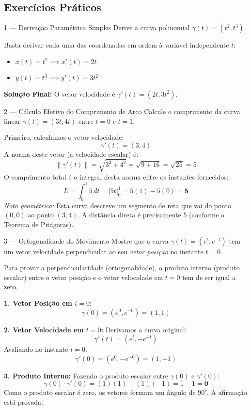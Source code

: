 \subsection{Exercícios Práticos}

\begin{exercisebox}{1 --- Derivação Paramétrica Simples}
  Derive a curva polinomial $\gamma(t)=(t^2, t^3)$.
\end{exercisebox}
\begin{solbox}
  Basta derivar cada uma das coordenadas em ordem à variável independente $t$:
  \begin{itemize}
      \item $x(t) = t^2 \implies x'(t) = 2t$
      \item $y(t) = t^3 \implies y'(t) = 3t^2$
  \end{itemize}
  \textbf{Solução Final:} O vetor velocidade é $\boxed{\gamma'(t) = (2t, 3t^2)}$.
\end{solbox}

\begin{exercisebox}{2 --- Cálculo Efetivo do Comprimento de Arco}
  Calcule o comprimento da curva linear $\gamma(t)=(3t, 4t)$ entre $t=0$ e $t=1$.
\end{exercisebox}
\begin{solbox}
  Primeiro, calculamos o vetor velocidade:
  \[
    \gamma'(t) = (3, 4)
  \]
  A norma deste vetor (a velocidade escalar) é:
  \[
    \|\gamma'(t)\| = \sqrt{3^2 + 4^2} = \sqrt{9 + 16} = \sqrt{25} = 5
  \]
  O comprimento total é o integral desta norma entre os instantes fornecidos:
  \[
    L = \int_0^1 5 \,dt = \Big[ 5t \Big]_0^1 = 5(1) - 5(0) = \mathbf{5}
  \]
  \textit{Nota geométrica:} Esta curva descreve um segmento de reta que vai do ponto $(0,0)$ ao ponto $(3,4)$. A distância direta é precisamente 5 (conforme o Teorema de Pitágoras).
\end{solbox}

\begin{exercisebox}{3 --- Ortogonalidade do Movimento}
  Mostre que a curva $\gamma(t)=(e^t, e^{-t})$ tem um vetor velocidade perpendicular ao seu \emph{vetor posição} no instante $t=0$.
\end{exercisebox}
\begin{solbox}
  Para provar a perpendicularidade (ortogonalidade), o produto interno (produto escalar) entre o vetor posição e o vetor velocidade em $t=0$ tem de ser igual a zero.
  
  \textbf{1. Vetor Posição em $t=0$:}
  \[
    \gamma(0) = (e^0, e^{-0}) = (1, 1)
  \]
  
  \textbf{2. Vetor Velocidade em $t=0$:}
  Derivamos a curva original:
  \[
    \gamma'(t) = (e^t, -e^{-t})
  \]
  Avaliando no instante $t=0$:
  \[
    \gamma'(0) = (e^0, -e^{-0}) = (1, -1)
  \]
  
  \textbf{3. Produto Interno:}
  Fazendo o produto escalar entre $\gamma(0)$ e $\gamma'(0)$:
  \[
    \gamma(0) \cdot \gamma'(0) = (1)(1) + (1)(-1) = 1 - 1 = \mathbf{0}
  \]
  Como o produto escalar é zero, os vetores formam um ângulo de $90^\circ$. A afirmação está provada. \checkmark
\end{solbox}

